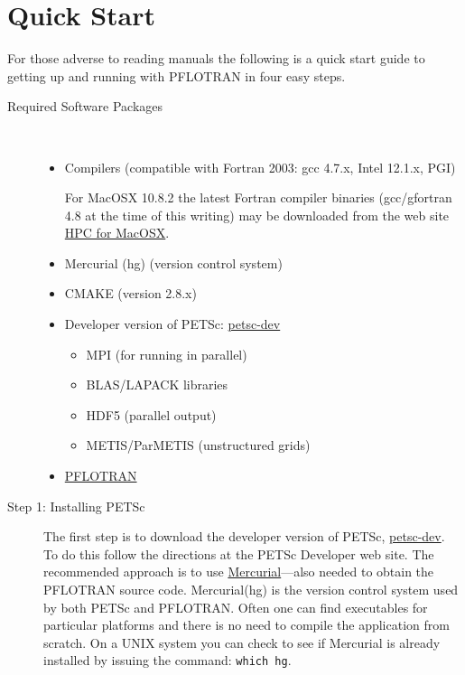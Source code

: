 \section{Quick Start}

For those adverse to reading manuals the following is a quick start guide to getting up and running with PFLOTRAN in four easy steps.

\begin{description}
\item[Required Software Packages] ~
\begin{itemize}
\item Compilers (compatible with Fortran 2003: gcc 4.7.x, Intel 12.1.x, PGI)

For MacOSX 10.8.2 the latest Fortran compiler binaries (gcc/gfortran 4.8 at the time of this writing) may be downloaded from the web site \href{http://hpc.sourceforge.net}{HPC for MacOSX}.


\item Mercurial (hg) (version control system)
\item CMAKE (version 2.8.x)
\item Developer version of PETSc: \href{http://www.mcs.anl.gov/petsc/developers/index.html}{petsc-dev}
\begin{itemize}
\item MPI (for running in parallel)
\item BLAS/LAPACK libraries
\item HDF5 (parallel output)
\item METIS/ParMETIS (unstructured grids)
\end{itemize}
\item \href{https://bitbucket.org/pflotran/pflotran-dev}{PFLOTRAN}
\end{itemize}

\item[Step 1: Installing PETSc] The first step is to download the developer version of PETSc, \href{http://www.mcs.anl.gov/petsc/developers/index.html}{petsc-dev}. To do this follow the directions at the PETSc Developer web site. The recommended approach is to use \href{http://mercurial.selenic.com/}{Mercurial}---also needed to obtain the PFLOTRAN source code. Mercurial(hg) is the version control system used by both PETSc and PFLOTRAN. Often one can find executables for particular platforms and there is no need to compile the application from scratch. On a UNIX system you can check to see if Mercurial is already installed by issuing the command: {\footnotesize\tt which hg}.


\end{description}
